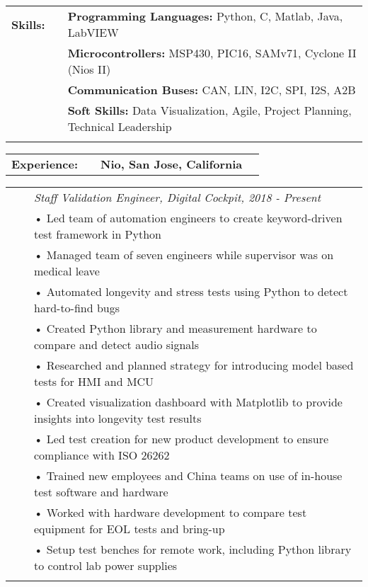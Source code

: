 \documentclass{minimal}
\begin{document}

\begin{center}
\fontsize{14}{12.8}\selectfont
\name\\
\fontsize{10}{12}\selectfont
\address\\
\phone\\
\email\\
\github\\
\end{center}
\vspace{0.5cm}

\begin{tabular}{ p{1.5cm} p{1cm} p{16cm} }
\textbf{Skills:} & & \textbf{Programming Languages:} Python, C, Matlab, Java, LabVIEW\\
& & \textbf{Microcontrollers:} MSP430, PIC16, SAMv71, Cyclone II (Nios II)\\
& & \textbf{Communication Buses:} CAN, LIN, I2C, SPI, I2S, A2B\\
& & \textbf{Soft Skills:} Data Visualization, Agile, Project Planning, Technical Leadership\\
& & \\
\end{tabular}

\begin{tabular}{ p{1.5cm} p{1cm} p{16cm} >{\raggedleft\arraybackslash}p{3cm} }
\textbf{Experience:} & & \textbf{Nio, San Jose, California} & \\
\end{tabular}

\begin{tabular}{ p{1.5cm} p{1cm} p{16cm} }
& & \textit{Staff Validation Engineer, Digital Cockpit, 2018 - Present}\\
& & • Led team of automation engineers to create keyword-driven test framework in Python\\
& & • Managed team of seven engineers while supervisor was on medical leave\\
& & • Automated longevity and stress tests using Python to detect hard-to-find bugs\\
& & • Created Python library and measurement hardware to compare and detect audio signals\\
& & • Researched and planned strategy for introducing model based tests for HMI and MCU\\
& & • Created visualization dashboard with Matplotlib to provide insights into longevity test results\\
& & • Led test creation for new product development to ensure compliance with ISO 26262\\
& & • Trained new employees and China teams on use of in-house test software and hardware\\
& & • Worked with hardware development to compare test equipment for EOL tests and bring-up\\
& & • Setup test benches for remote work, including Python library to control lab power supplies\\
& & \\
\end{tabular}
\end{document}
